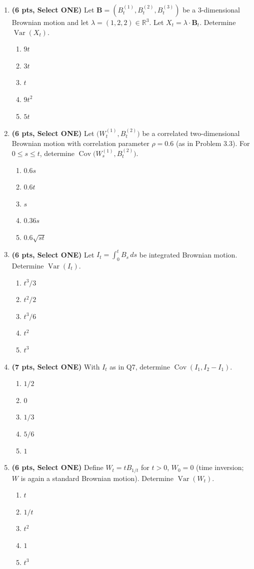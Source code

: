 \documentclass[11pt]{article}
\newcommand{\R}{\mathbb{R}}
\DeclareMathOperator{\Var}{Var}
\DeclareMathOperator{\Cov}{Cov}
\begin{document}
\begin{enumerate}
\item[\textbf{Q5.}] \textbf{(6 pts, Select ONE)} Let $\boldsymbol B=(B_t^{(1)},B_t^{(2)},B_t^{(3)})$ be a $3$-dimensional Brownian motion and let $\lambda=(1,2,2)\in\R^3$. Let $X_t=\lambda\cdot \boldsymbol B_t$. Determine $\Var(X_t)$.
\begin{enumerate}
  \item $9t$
  \item $3t$
  \item $t$
  \item $9t^2$
  \item $5t$
\end{enumerate}

\item[\textbf{Q6.}] \textbf{(6 pts, Select ONE)} Let $\big(W_t^{(1)},B_t^{(2)}\big)$ be a correlated two-dimensional Brownian motion with correlation parameter $\rho=0.6$ (as in Problem 3.3). For $0\le s\le t$, determine $\Cov\big(W_s^{(1)},B_t^{(2)}\big)$.
\begin{enumerate}
  \item $0.6s$
  \item $0.6t$
  \item $s$
  \item $0.36s$
  \item $0.6\sqrt{st}$
\end{enumerate}

\item[\textbf{Q7.}] \textbf{(6 pts, Select ONE)} Let $I_t=\int_0^tB_s\,ds$ be integrated Brownian motion. Determine $\Var(I_t)$.
\begin{enumerate}
  \item $t^3/3$
  \item $t^2/2$
  \item $t^3/6$
  \item $t^2$
  \item $t^3$
\end{enumerate}

\item[\textbf{Q8.}] \textbf{(7 pts, Select ONE)} With $I_t$ as in Q7, determine $\Cov(I_1,I_2-I_1)$.
\begin{enumerate}
  \item $1/2$
  \item $0$
  \item $1/3$
  \item $5/6$
  \item $1$
\end{enumerate}

\item[\textbf{Q9.}] \textbf{(6 pts, Select ONE)} Define $W_t=tB_{1/t}$ for $t>0$, $W_0=0$ (time inversion; $W$ is again a standard Brownian motion). Determine $\Var(W_t)$.
\begin{enumerate}
  \item $t$
  \item $1/t$
  \item $t^2$
  \item $1$
  \item $t^3$
\end{enumerate}


\end{enumerate}
\end{document}
